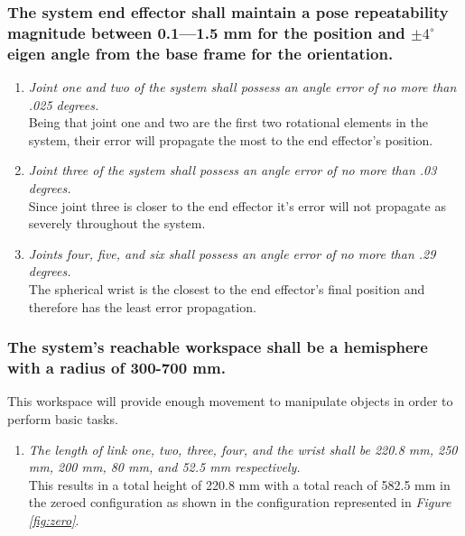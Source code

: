 \documentclass[12pt]{report}
\begin{document}
\subsubsection{The system end effector shall maintain a pose repeatability magnitude between 0.1—1.5 mm for the position and \(\pm 4^{\circ}\) eigen angle from the base frame for the orientation.}
\begin{enumerate}[label=\thesubsubsection.\alph*,leftmargin=3cm,font=\itshape]
  \item \textit{Joint one and two of the system shall possess an angle error of no more than .025 degrees.} \\
  Being that joint one and two are the first two rotational elements in the system, their error will propagate the most to the end effector's position.
  \item \textit{Joint three of the system shall possess an angle error of no more than .03 degrees.} \\
  Since joint three is closer to the end effector it's error will not propagate as severely throughout the system.
  \item \textit{Joints four, five, and six shall possess an angle error of no more than .29 degrees.} \\
  The spherical wrist is the closest to the end effector's final position and therefore has the least error propagation.
\end{enumerate}
\subsubsection{The system’s reachable workspace shall be a hemisphere with a radius of 300-700 mm.}
This workspace will provide enough movement to manipulate objects in order to perform basic tasks.
\begin{enumerate}[label=\thesubsubsection.\alph*,leftmargin=3cm,font=\itshape]
  \item \textit{The length of link one, two, three, four, and the wrist shall be 220.8 mm, 250 mm, 200 mm, 80 mm, and 52.5 mm respectively.} \\
  This results in a total height of 220.8 mm with a total reach of 582.5 mm in the zeroed configuration as shown in the configuration represented in \emph{Figure \ref{fig:zero}}.
\end{enumerate}
\end{document}
